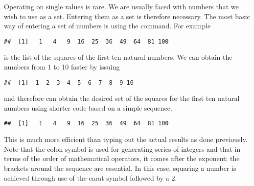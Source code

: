 Operating on single values is rare. We are usually faced with numbers that we wish to use as a set. Entering them as a set is therefore necessary. The most basic way of entering a set of numbers is using the  command. For example 
\begin{knitrout}
\color{fgcolor}\begin{kframe}
\begin{alltt}
\hlkwb{=}\hlstd{(}\hlstd{,} \hlstd{,} \hlstd{,} \hlstd{,} \hlstd{,} \hlstd{,} \hlstd{,} \hlstd{,} \hlstd{,} \hlstd{)}
\end{alltt}
\begin{verbatim}
##  [1]   1   4   9  16  25  36  49  64  81 100
\end{verbatim}
\end{kframe}
\end{knitrout}
is the list of the squares of the first ten natural numbers. We can obtain the numbers from 1 to 10 faster by issuing 
\begin{knitrout}
\color{fgcolor}\begin{kframe}
\begin{alltt}
\hlkwb{=}\hlopt{:}
\end{alltt}
\begin{verbatim}
##  [1]  1  2  3  4  5  6  7  8  9 10
\end{verbatim}
\end{kframe}
\end{knitrout}
and therefore can obtain the desired set of the squares for the first ten natural numbers using shorter code based on a simple sequence. 
\begin{knitrout}
\color{fgcolor}\begin{kframe}
\begin{alltt}
\hlkwb{=}\hlstd{(}\hlopt{:}\hlstd{)}\hlopt{^}
\end{alltt}
\begin{verbatim}
##  [1]   1   4   9  16  25  36  49  64  81 100
\end{verbatim}
\end{kframe}
\end{knitrout}
This is much more efficient than typing out the actual results as done previously. Note that the colon symbol is used for generating series of integers and that in terms of the order of mathematical operators, it comes after the exponent; the brackets around the sequence are essential. In this case, squaring a number is achieved through use of the carat symbol followed by a 2.  
 
